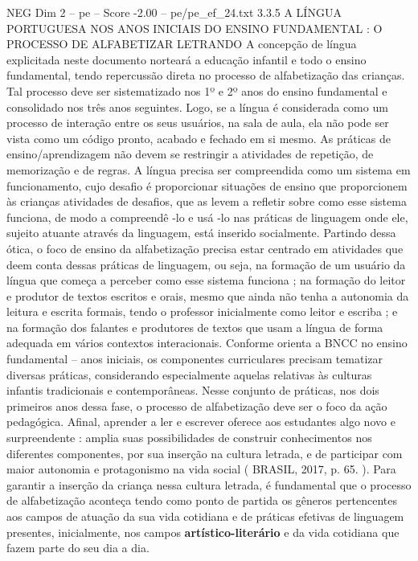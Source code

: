 \begin{textsample}{NEG Dim 2 – pe – Score -2.00 – pe/pe\_ef\_24.txt}  \label{ex:f2_neg_033}
3.3.5 A LÍNGUA PORTUGUESA NOS ANOS INICIAIS DO ENSINO FUNDAMENTAL : O PROCESSO DE ALFABETIZAR LETRANDO A concepção de língua explicitada neste documento norteará a educação infantil e todo o ensino fundamental, tendo repercussão direta no processo de alfabetização das crianças.
Tal processo deve ser sistematizado nos 1º e 2º anos do ensino fundamental e consolidado nos três anos seguintes.
Logo, se a língua é considerada como um processo de interação entre os seus usuários, na sala de aula, ela não pode ser vista como um código pronto, acabado e fechado em si mesmo.
As práticas de ensino/aprendizagem não devem se restringir a atividades de repetição, de memorização e de regras.
A língua precisa ser compreendida como um sistema em funcionamento, cujo desafio é proporcionar situações de ensino que proporcionem às crianças atividades de desafios, que as levem a refletir sobre como esse sistema funciona, de modo a compreendê -lo e usá -lo nas práticas de linguagem onde ele, sujeito atuante através da linguagem, está inserido socialmente.
Partindo dessa ótica, o foco de ensino da alfabetização precisa estar centrado em atividades que deem conta dessas práticas de linguagem, ou seja, na formação de um usuário da língua que começa a perceber como esse sistema funciona ; na formação do leitor e produtor de textos escritos e orais, mesmo que ainda não tenha a autonomia da leitura e escrita formais, tendo o professor inicialmente como leitor e escriba ; e na formação dos falantes e produtores de textos que usam a língua de forma adequada em vários contextos interacionais.
Conforme orienta a BNCC no ensino fundamental – anos iniciais, os componentes curriculares precisam tematizar diversas práticas, considerando especialmente aquelas relativas às culturas infantis tradicionais e contemporâneas.
Nesse conjunto de práticas, nos dois primeiros anos dessa fase, o processo de alfabetização deve ser o foco da ação pedagógica.
Afinal, aprender a ler e escrever oferece aos estudantes algo novo e surpreendente : amplia suas possibilidades de construir conhecimentos nos diferentes componentes, por sua inserção na cultura letrada, e de participar com maior autonomia e protagonismo na vida social ( BRASIL, 2017, p. 65. ).
Para garantir a inserção da criança nessa cultura letrada, é fundamental que o processo de alfabetização aconteça tendo como ponto de partida os gêneros pertencentes aos campos de atuação da sua vida cotidiana e de práticas efetivas de linguagem presentes, inicialmente, nos campos \textbf{artístico-literário} e da vida cotidiana que fazem parte do seu dia a dia.

\end{textsample}
